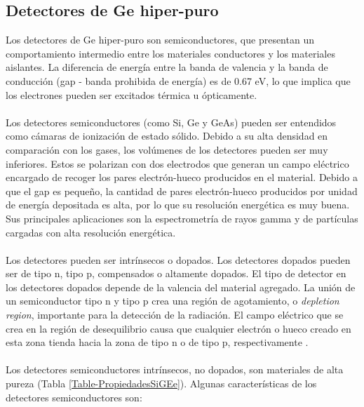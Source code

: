 	\subsection{Detectores de Ge hiper-puro}\label{SubSec-DetecGe}
Los detectores de Ge hiper-puro son semiconductores, que presentan un comportamiento intermedio entre los materiales conductores y los materiales aislantes. La diferencia de energía entre la banda de valencia y la banda de conducción (gap - banda prohibida de energía) es de 0.67 eV, lo que implica que los electrones pueden ser excitados térmica u ópticamente. 
\\ \\
Los detectores semiconductores (como Si, Ge y GeAs) pueden ser entendidos  como cámaras de ionización de estado sólido. Debido a su alta densidad en comparación con los gases, los volúmenes de los detectores pueden ser muy inferiores. Estos se polarizan con dos electrodos que generan un campo eléctrico encargado de recoger los pares electrón-hueco producidos en el material. Debido a que el gap es pequeño, la cantidad de pares electrón-hueco producidos por unidad de energía depositada es alta, por lo que su resolución energética es muy buena. Sus principales aplicaciones son la espectrometría de rayos gamma y de partículas cargadas con alta resolución energética.
\\ \\
Los detectores pueden ser intrínsecos o dopados. Los detectores dopados pueden ser de tipo n, tipo p, compensados o altamente dopados. El tipo de detector en los detectores dopados depende de la valencia del material agregado. La unión de un semiconductor tipo n y tipo p crea una región de agotamiento, o \textit{depletion region}, importante para la detección de la radiación. El campo eléctrico que se crea en la región de desequilibrio causa que cualquier electrón o hueco creado en esta zona tienda hacia la zona de tipo n o de tipo p, respectivamente \cite{knoll2010radiation}. 
\\\\
Los detectores semiconductores intrínsecos, no dopados, son materiales de alta pureza (Tabla \ref{Table-PropiedadesSiGEe}). Algunas características de los detectores semiconductores son:
